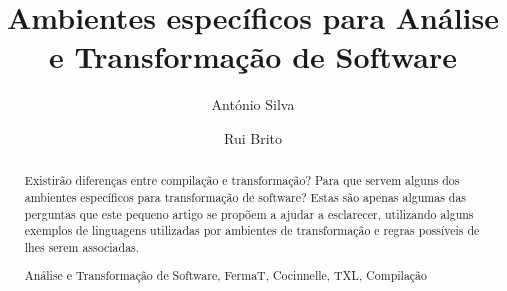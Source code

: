 \documentclass[runningheads,a4paper]{llncs}
\newcommand{\keywords}[1]{\par\addvspace\baselineskip
\noindent\keywordname\enspace\ignorespaces#1}
\begin{document}
\mainmatter

\title{Ambientes específicos para Análise e Transformação de Software}



\author{António Silva\and Rui Brito}





\maketitle


\begin{abstract}
Existirão diferenças entre compilação e transformação? Para que servem alguns dos ambientes específicos para transformação de software? Estas são apenas algumas das perguntas que este pequeno artigo se propõem a ajudar a esclarecer, utilizando alguns exemplos de linguagens utilizadas por ambientes de transformação e regras possíveis de lhes serem associadas.
\keywords{Análise e Transformação de Software, FermaT, Cocinnelle, TXL, Compilação}
\end{abstract}
\end{document}
